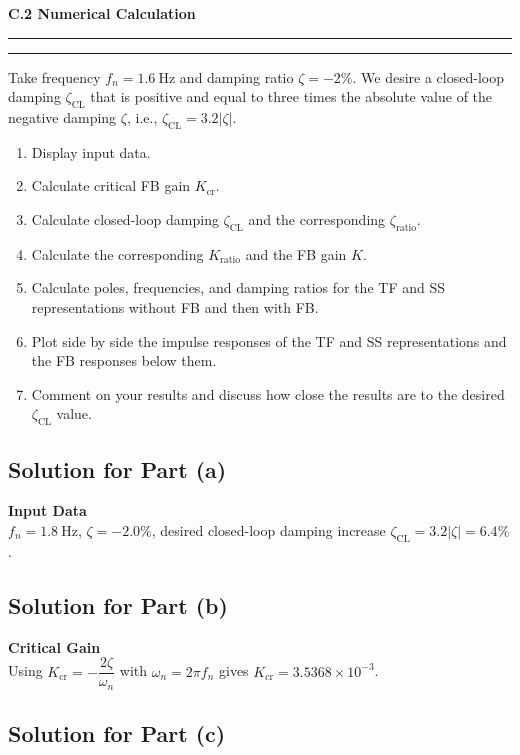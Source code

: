 \documentclass[12pt]{article}
\newcommand{\question}[1]{%
  \clearpage
  \vspace{0.5cm}
  {\noindent\normalsize \textbf{#1}}%
  \vspace{0.2cm}
  \hrule
  \vspace{0.1cm}
  \hrule
  \vspace{0.3cm}
}
\begin{document}
\question{C.2 Numerical Calculation}\label{quest:C2}

Take frequency $f_n = 1.6~\mathrm{Hz}$ and damping ratio $\zeta = -2\%$. We desire a closed-loop damping $\zeta_{\text{CL}}$ that is positive and equal to three times the absolute value of the negative damping $\zeta$, i.e., $\zeta_{\text{CL}} = 3.2|\zeta|$.
\begin{enumerate}[label=(\alph*)]
  \item Display input data.
  \item Calculate critical FB gain $K_{\text{cr}}$.
  \item Calculate closed-loop damping $\zeta_{\text{CL}}$ and the corresponding $\zeta_{\text{ratio}}$.
  \item Calculate the corresponding $K_{\text{ratio}}$ and the FB gain $K$.
  \item Calculate poles, frequencies, and damping ratios for the TF and SS representations without FB and then with FB.
  \item Plot side by side the impulse responses of the TF and SS representations and the FB responses below them.
  \item Comment on your results and discuss how close the results are to the desired $\zeta_{\text{CL}}$ value.
\end{enumerate}
\subsection*{Solution for Part (a)}

\begin{resultsbox}
\textbf{Input Data}\\[0.5em]
$f_n = 1.8~\text{Hz}$, $\zeta = -2.0\%$, desired closed-loop damping increase $\zeta_{\text{CL}} = 3.2|\zeta| = 6.4\%$.
\end{resultsbox}

\subsection*{Solution for Part (b)}

\begin{resultsbox}
\textbf{Critical Gain}\\[0.5em]
Using $K_{\text{cr}} = -\dfrac{2\zeta}{\omega_n}$ with $\omega_n = 2\pi f_n$ gives $K_{\text{cr}} = 3.5368\times 10^{-3}$.
\end{resultsbox}

\subsection*{Solution for Part (c)}
\end{document}
